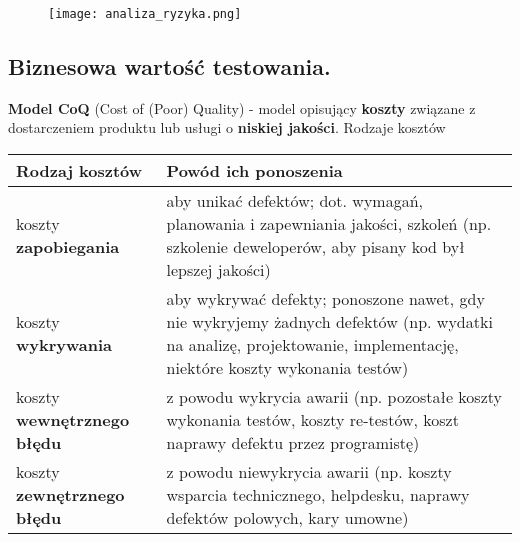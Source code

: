 \documentclass[../main.tex]{subfiles}
\begin{document}
    \begin{figure}[H]
        \texttt{[image: analiza\_ryzyka.png]}
    \end{figure}

    \subsection{Biznesowa wartość testowania.}

    \textbf{Model CoQ} (Cost of (Poor) Quality) - model opisujący \textbf{koszty} związane z dostarczeniem
    produktu lub usługi o \textbf{niskiej jakości}.
    Rodzaje kosztów

    \begin{table}[H]
        \begin{center}
            \begin{tabular}{| p{5cm} || p{11cm} |}
                \hline
                \textbf{Rodzaj kosztów}            & \textbf{Powód ich ponoszenia}                                                                                                                                      \\
                \hline
                \hline
                koszty \textbf{zapobiegania}       & aby unikać defektów; dot. wymagań, planowania i zapewniania jakości, szkoleń (np. szkolenie deweloperów, aby pisany kod był lepszej jakości)                       \\
                \hline
                koszty \textbf{wykrywania}         & aby wykrywać defekty; ponoszone nawet, gdy nie wykryjemy żadnych defektów (np. wydatki na analizę, projektowanie, implementację, niektóre koszty wykonania testów) \\
                \hline
                koszty \textbf{wewnętrznego błędu} & z powodu wykrycia awarii (np. pozostałe koszty wykonania testów, koszty re-testów, koszt naprawy defektu przez programistę)                                        \\
                \hline
                koszty \textbf{zewnętrznego błędu} & z powodu niewykrycia awarii (np. koszty wsparcia technicznego, helpdesku, naprawy defektów polowych, kary umowne)                                                  \\
                \hline
            \end{tabular}
        \end{center}
    \end{table}
\end{document}
